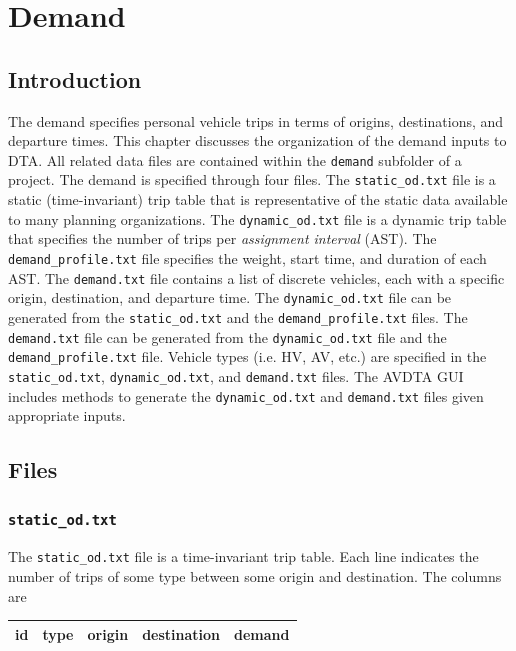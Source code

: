 \chapter{Demand}
\label{ch:demand}

\section{Introduction}

The demand specifies personal vehicle trips in terms of origins, destinations, and departure times. This chapter discusses the organization of the demand inputs to DTA. All related data files are contained within the \texttt{demand} subfolder of a project. The demand is specified through four files. The \texttt{static\_od.txt} file is a static (time-invariant) trip table that is representative of the static data available to many planning organizations. The \texttt{dynamic\_od.txt} file is a dynamic trip table that specifies the number of trips per \textit{assignment interval} (AST). The \texttt{demand\_profile.txt} file specifies the weight, start time, and duration of each AST. The \texttt{demand.txt} file contains a list of discrete vehicles, each with a specific origin, destination, and departure time. The \texttt{dynamic\_od.txt} file can be generated from the \texttt{static\_od.txt} and the \texttt{demand\_profile.txt} files. The \texttt{demand.txt} file can be generated from the \texttt{dynamic\_od.txt} file and the \texttt{demand\_profile.txt} file.
Vehicle types (i.e. HV, AV, etc.) are specified in the \texttt{static\_od.txt}, \texttt{dynamic\_od.txt}, and \texttt{demand.txt} files. The AVDTA GUI includes methods to generate the \texttt{dynamic\_od.txt} and \texttt{demand.txt} files given appropriate inputs.

\section{Files} 

\subsection{\texttt{static\_od.txt}}
\label{sec:staticod}

The \texttt{static\_od.txt} file is a time-invariant trip table. Each line indicates the number of trips of some type between some origin and destination. The columns are 
\begin{center}
\begin{tabular}{ccccc}
\hline
id & type & origin & destination & demand\\\hline
\end{tabular}
\end{center}
